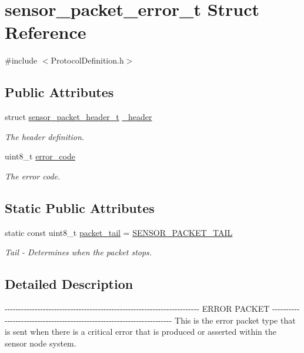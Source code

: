 \hypertarget{structsensor__packet__error__t}{\section{sensor\-\_\-packet\-\_\-error\-\_\-t \-Struct \-Reference}
\label{structsensor__packet__error__t}
}


{\ttfamily \#include $<$\-Protocol\-Definition.\-h$>$}

\subsection*{\-Public \-Attributes}
\begin{DoxyCompactItemize}
\item 
struct \hyperlink{structsensor__packet__header__t}{sensor\-\_\-packet\-\_\-header\-\_\-t} \hyperlink{structsensor__packet__error__t_afc6ca3d4fddf28cff349a2b951a3b70c}{\-\_\-header}
\begin{DoxyCompactList}\small\item\em \-The header definition. \end{DoxyCompactList}\item 
uint8\-\_\-t \hyperlink{structsensor__packet__error__t_a7a9d81b8541bde21d138d81872f4a1b6}{error\-\_\-code}
\begin{DoxyCompactList}\small\item\em \-The error code. \end{DoxyCompactList}\end{DoxyCompactItemize}
\subsection*{\-Static \-Public \-Attributes}
\begin{DoxyCompactItemize}
\item 
static const uint8\-\_\-t \hyperlink{structsensor__packet__error__t_ab66c67aef83ad090f7cdde358308bee8}{packet\-\_\-tail} = \hyperlink{_protocol_definition_8h_aba63cacf112bcb4c2ac7ffaeb1454114}{\-S\-E\-N\-S\-O\-R\-\_\-\-P\-A\-C\-K\-E\-T\-\_\-\-T\-A\-I\-L}
\begin{DoxyCompactList}\small\item\em \-Tail -\/ \-Determines when the packet stops. \end{DoxyCompactList}\end{DoxyCompactItemize}


\subsection{\-Detailed \-Description}
-\/-\/-\/-\/-\/-\/-\/-\/-\/-\/-\/-\/-\/-\/-\/-\/-\/-\/-\/-\/-\/-\/-\/-\/-\/-\/-\/-\/-\/-\/-\/-\/-\/-\/-\/-\/-\/-\/-\/-\/-\/-\/-\/-\/-\/-\/-\/-\/-\/-\/-\/-\/-\/-\/-\/-\/-\/-\/-\/-\/-\/-\/-\/-\/-\/-\/-\/-\/-\/-\/-\/ \-E\-R\-R\-O\-R \-P\-A\-C\-K\-E\-T -\/-\/-\/-\/-\/-\/-\/-\/-\/-\/-\/-\/-\/-\/-\/-\/-\/-\/-\/-\/-\/-\/-\/-\/-\/-\/-\/-\/-\/-\/-\/-\/-\/-\/-\/-\/-\/-\/-\/-\/-\/-\/-\/-\/-\/-\/-\/-\/-\/-\/-\/-\/-\/-\/-\/-\/-\/-\/-\/-\/-\/-\/-\/-\/-\/-\/-\/-\/-\/-\/-\/ \-This is the error packet type that is sent when there is a critical error that is produced or asserted within the sensor node system. 

